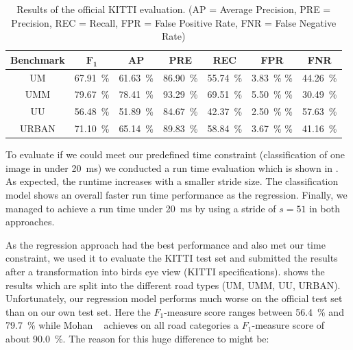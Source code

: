 \begin{table}[]
    \begin{center}
    \begin{tabular}{c|cccccc}
        \toprule
        {\bf Benchmark} & {\bf $\mathbf{F_1}$} & {\bf AP} & {\bf PRE} & {\bf REC} & {\bf FPR} & {\bf FNR}\\
        \midrule
        UM    & \SI{67.91}{\percent} & \SI{61.63}{\percent} & \SI{86.90}{\percent} & \SI{55.74}{\percent} & \SI{3.83}{\percent} \% & \SI{44.26}{\percent}\\
        UMM   & \SI{79.67}{\percent} & \SI{78.41}{\percent} & \SI{93.29}{\percent} & \SI{69.51}{\percent} & \SI{5.50}{\percent} \% & \SI{30.49}{\percent}\\
        UU    & \SI{56.48}{\percent} & \SI{51.89}{\percent} & \SI{84.67}{\percent} & \SI{42.37}{\percent} & \SI{2.50}{\percent} \% & \SI{57.63}{\percent}\\
        URBAN & \SI{71.10}{\percent} & \SI{65.14}{\percent} & \SI{89.83}{\percent} & \SI{58.84}{\percent} & \SI{3.67}{\percent} \% & \SI{41.16}{\percent}\\
        \bottomrule
        \end{tabular}
    \end{center}
    \caption{Results of the official KITTI evaluation. (AP = Average Precision, PRE = Precision, REC = Recall, FPR = False Positive Rate, FNR = False Negative Rate)}
    \label{tab:kitti}
\end{table}

To evaluate if we could meet our predefined time constraint (classification of
one image in under \SI{20}{\milli\second}) we conducted a run time evaluation
which is shown in . As expected, the runtime increases with a
smaller stride size. The classification model shows an overall faster run time
performance as the regression. Finally, we managed to achieve a run time under
\SI{20}{\milli\second} by using a stride of $s=51$ in both approaches.

As the regression approach had the best performance and also met our time
constraint, we used it to evaluate the KITTI test set and submitted the results
after a transformation into birds eye view (KITTI
specifications). shows the results which are split into the
different road types (UM, UMM, UU, URBAN).
Unfortunately, our regression model performs much worse on the official test
set than on our own test set. Here the $F_1$-measure score ranges between
\SI{56.4}{\percent} and \SI{79.7}{\percent} while Mohan ~\cite{Tarel2009}
achieves on all road categories a $F_1$-measure score of about
\SI{90.0}{\percent}. The reason for this huge difference to might be: \\


